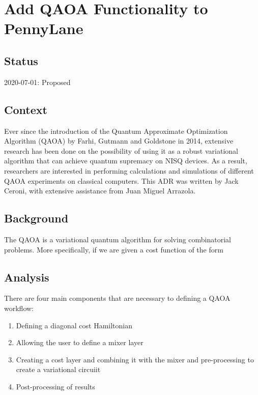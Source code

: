 \documentclass{article}
\begin{document}
\section{Add QAOA Functionality to PennyLane}

\subsection{Status}

2020-07-01: Proposed

\subsection{Context}

Ever since the introduction of the Quantum Approximate Optimization Algorithm (QAOA) 
by Farhi, Gutmann and Goldstone in 2014, extensive research 
has been done on the possibility of using it as a robust variational algorithm that can 
achieve quantum supremacy on NISQ devices. As 
a result, researchers are interested in performing calculations and simulations of different 
QAOA experiments on classical computers.
\newline\newline
\noindent
This ADR was written by Jack Ceroni, with extensive assistance from Juan Miguel Arrazola.

\subsection{Background}

The QAOA is a variational quantum algorithm for solving combinatorial problems. More specifically, 
if we are given a cost function of the form

\subsection{Analysis}

There are four main components that are necessary to defining a QAOA workflow:

\begin{enumerate}
	\item Defining a diagonal cost Hamiltonian
	\item Allowing the user to define a mixer layer
	\item Creating a cost layer and combining it with the mixer and pre-processing 
	      to create a variational circuiit
      	\item Post-processing of results 
\end{enumerate}
\end{document}
